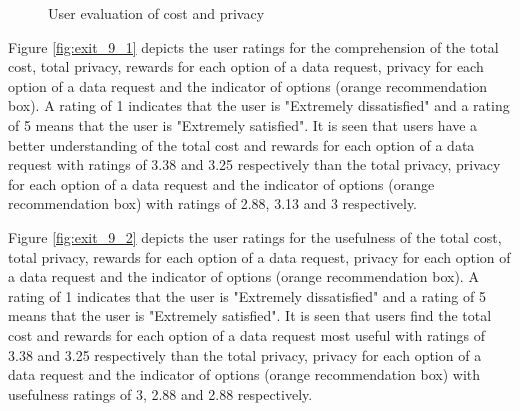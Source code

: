\begin{figure}[htp]
\hspace{1em}
\newline
\centering
{}
\caption{User evaluation of cost and privacy}
\label{fig:st3}
\end{figure}

Figure \ref{fig:exit_9_1} depicts the user ratings for the comprehension of the total cost, total privacy, rewards for each option of a data request, privacy for each option of a data request and the indicator of options (orange recommendation box). A rating of 1 indicates that the user is "Extremely dissatisfied" and a rating of 5 means that the user is "Extremely satisfied". It is seen that users have a better understanding of the total cost and rewards for each option of a data request with ratings of 3.38 and 3.25 respectively than the total privacy, privacy for each option of a data request and the indicator of options (orange recommendation box) with ratings of 2.88, 3.13 and 3 respectively.

Figure \ref{fig:exit_9_2} depicts the user ratings for the usefulness of the total cost, total privacy, rewards for each option of a data request, privacy for each option of a data request and the indicator of options (orange recommendation box). A rating of 1 indicates that the user is "Extremely dissatisfied" and a rating of 5 means that the user is "Extremely satisfied". It is seen that users find the total cost and rewards for each option of a data request most useful with ratings of 3.38 and 3.25 respectively than the total privacy, privacy for each option of a data request and the indicator of options (orange recommendation box) with usefulness ratings of 3, 2.88 and 2.88 respectively.

